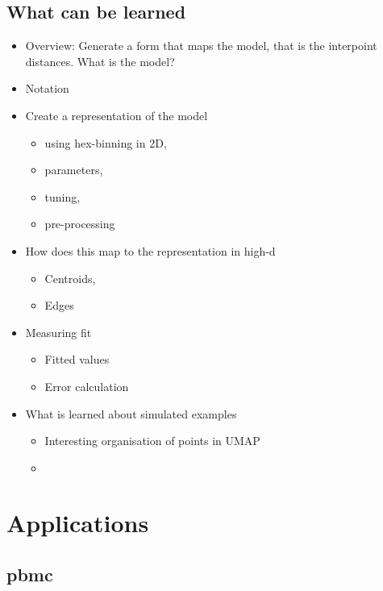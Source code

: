 \documentclass[
  12pt]{article}
\providecommand{\tightlist}{%
  \setlength{\itemsep}{0pt}\setlength{\parskip}{0pt}}\usepackage{longtable,booktabs,array}
\def\tightlist{}
\begin{document}
\subsection{What can be learned}\label{what-can-be-learned}

\begin{itemize}
\tightlist
\item
  Overview: Generate a form that maps the model, that is the interpoint
  distances. What is the model?
\item
  Notation
\item
  Create a representation of the model

  \begin{itemize}
  \tightlist
  \item
    using hex-binning in 2D,
  \item
    parameters,
  \item
    tuning,
  \item
    pre-processing
  \end{itemize}
\item
  How does this map to the representation in high-d

  \begin{itemize}
  \tightlist
  \item
    Centroids,
  \item
    Edges
  \end{itemize}
\item
  Measuring fit

  \begin{itemize}
  \tightlist
  \item
    Fitted values
  \item
    Error calculation
  \end{itemize}
\item
  What is learned about simulated examples

  \begin{itemize}
  \tightlist
  \item
    Interesting organisation of points in UMAP
  \item
  \end{itemize}
\end{itemize}

\section{Applications}\label{sec-applications}

\subsection{pbmc}\label{pbmc}
\end{document}

